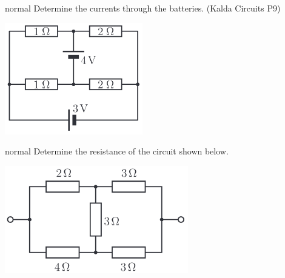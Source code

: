 \hypertarget{P14}{}
\begin{solution}{normal} %
Determine the currents through the batteries. (Kalda Circuits P9)
\begin{center}
    \includegraphics[width=0.45\textwidth]{S1 Figures/S1-14.png}
\end{center}
\end{solution}

\hypertarget{P15}{}
\begin{solution}{normal} %
Determine the resistance of the circuit shown below.
\begin{center}
    \includegraphics[width=0.6\textwidth]{S1 Figures/S1-15.png}
\end{center}
\end{solution}


